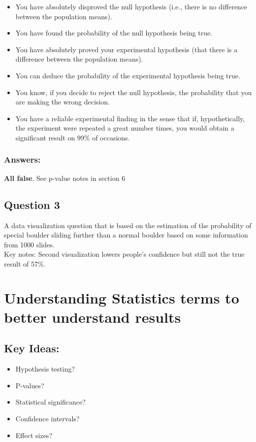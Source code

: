 \begin{itemize}
    \item You have absolutely disproved the null hypothesis (i.e., there is no difference between the population means).
    
    \item You have found the probability of the null hypothesis being true.
    
    
    \item You have absolutely proved your experimental hypothesis (that there is a difference between the population means).
    
    \item You can deduce the probability of the experimental hypothesis being true.
    
    \item You know, if you decide to reject the null hypothesis, the probability that you are making the wrong decision.
    
    \item You have a reliable experimental finding in the sense that if, hypothetically, the experiment were repeated a great number times, you would obtain a significant result on 99\% of occasions.\\
\end{itemize}

\subsubsection{Answers:}
\textbf{All false}. See p-value notes in section 6

\subsection{Question 3}
A data visualization question that is based on the estimation of the probability of special boulder sliding further than a normal boulder based on some information from 1000 slides. \\

\noindent Key notes: Second visualization lowers people's confidence but still not the true result of 57\%. \\


\section{Understanding Statistics terms to better understand results}
\subsection{Key Ideas:}
\begin{itemize}
    \item Hypothesis testing?
    \item P-values?
    \item Statistical significance?
    \item Confidence intervals?
    \item Effect sizes?
\end{itemize}

